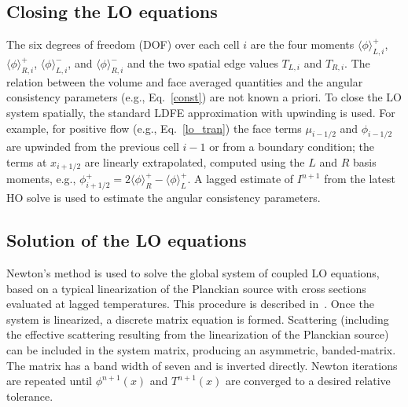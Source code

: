 \documentclass[11pt]{article}
\newcommand{\mom}[1]{\langle #1 \rangle}
\begin{document}
\subsection{Closing the LO equations}

The six degrees of freedom (DOF) over each cell $i$ are the four moments $\mom{\phi}_{L,i}^+$,
$\mom{\phi}_{R,i}^+$, $\mom{\phi}_{L,i}^-$, and $\mom{\phi}_{R,i}^-$ and the two
spatial edge values $T_{L,i}$ and $T_{R,i}$. The relation between the volume and face averaged quantities and the angular consistency parameters (e.g., Eq.~\eqref{const}) are not known a priori. 
To close the LO system spatially, the standard LDFE approximation with upwinding is
used.  For example, for positive flow (e.g., Eq.~\eqref{lo_tran}) the face terms $\mu_{i-1/2}$ and $\phi_{i-1/2}$
are upwinded from the previous cell $i-1$ or from a boundary condition; the terms
at $x_{i+1/2}$ are linearly extrapolated, computed using the $L$ and $R$ basis
moments, e.g., $\phi^+_{i+1/2} = 2\mom{\phi}_R^+ - \mom{\phi}_L^+$. 
A lagged estimate of $I^{n+1}$ from the latest HO solve is
used to estimate the angular consistency parameters. 

\subsection{Solution of the LO equations}
\label{sec:lo_sol}

Newton's method is used to solve the global system of coupled LO
equations, based on a typical linearization of the Planckian source with cross
sections evaluated at lagged temperatures.  This procedure is described
in~\cite{morel_newton}. 
Once the system is linearized, a discrete matrix equation is formed.  Scattering
(including the effective scattering resulting from the linearization of the
Planckian source) can
be included in the system matrix, producing an asymmetric, banded-matrix.  The matrix
has a band width of seven and is inverted directly.
Newton iterations are repeated until $\phi^{n+1}(x)$ and $T^{n+1}(x)$ are converged
to a desired relative tolerance. 
\end{document}
